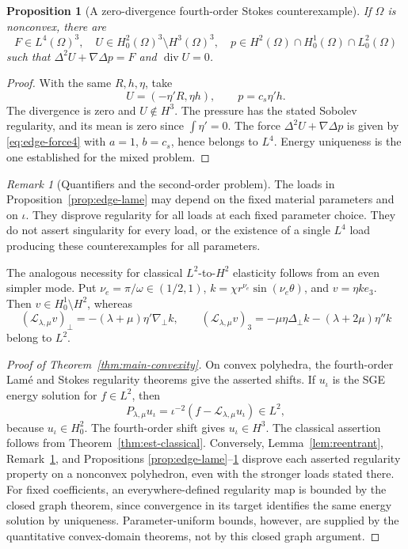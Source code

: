 \documentclass[11pt,a4paper]{article}
\newtheorem{proposition}[theorem]{Proposition}
\theoremstyle{remark}
\newtheorem{remark}[theorem]{Remark}
\numberwithin{equation}{section}
\begin{document}
\begin{proposition}[A zero-divergence fourth-order Stokes counterexample]
\label{prop:edge-stokes}
If $\Omega$ is nonconvex, there are
\[
 F\in L^4(\Omega)^3,\quad
 U\in H^2_0(\Omega)^3\setminus H^3(\Omega)^3,\quad
 p\in H^2(\Omega)\cap H^1_0(\Omega)\cap L^2_0(\Omega)
\]
such that $\Delta^2U+\nabla\Delta p=F$ and $\operatorname{div}U=0$.
\end{proposition}
\begin{proof}
With the same $R,h,\eta$, take
\[
 U=(-\eta'R,\eta h),\qquad p=c_s\eta'h .
\]
The divergence is zero and $U\notin H^3$.
The pressure has the stated Sobolev regularity, and its mean is zero
since $\int\eta'=0$.
The force $\Delta^2U+\nabla\Delta p$ is given by
\eqref{eq:edge-force4} with $a=1$, $b=c_s$, hence belongs to $L^4$.
Energy uniqueness is the one established for the mixed problem.
\end{proof}

\begin{remark}[Quantifiers and the second-order problem]\label{rem:quantifiers}
The loads in Proposition~\ref{prop:edge-lame} may depend on the fixed
material parameters and on $\iota$.
They disprove regularity for all loads at each fixed parameter choice.
They do not assert singularity for every load, or the existence of a
single $L^4$ load producing these counterexamples for all parameters.

The analogous necessity for classical $L^2$-to-$H^2$ elasticity follows
from an even simpler mode.  Put $\nu_e=\pi/\omega\in(1/2,1)$,
$k=\chi r^{\nu_e}\sin(\nu_e\theta)$, and $v=\eta k e_3$.
Then $v\in H^1_0\setminus H^2$, whereas
\[
 (\mathcal L_{\lambda,\mu}v)_\perp
 =-(\lambda+\mu)\eta'\nabla_\perp k,\qquad
 (\mathcal L_{\lambda,\mu}v)_3
 =-\mu\eta\Delta_\perp k-(\lambda+2\mu)\eta''k
\]
belong to $L^2$.
\end{remark}

\begin{proof}[Proof of Theorem~\ref{thm:main-convexity}]
On convex polyhedra, the fourth-order Lam\'e and Stokes regularity theorems
give the asserted shifts.  If $u_\iota$ is the SGE energy solution for
$f\in L^2$, then
\[
 P_{\lambda,\mu}u_\iota
 =\iota^{-2}(f-\mathcal L_{\lambda,\mu}u_\iota)\in L^2,
\]
because $u_\iota\in H^2_0$.  The fourth-order shift gives $u_\iota\in H^3$.
The classical assertion follows from Theorem~\ref{thm:est-classical}.
Conversely, Lemma~\ref{lem:reentrant}, Remark~\ref{rem:quantifiers},
and Propositions
\ref{prop:edge-lame}--\ref{prop:edge-stokes} disprove each asserted
regularity property on a nonconvex polyhedron, even with the stronger
loads stated there.  For fixed coefficients, an everywhere-defined
regularity map is bounded by the closed graph theorem, since convergence
in its target identifies the same energy solution by uniqueness.
Parameter-uniform bounds, however, are supplied by the quantitative
convex-domain theorems, not by this closed graph argument.
\end{proof}
\end{document}

